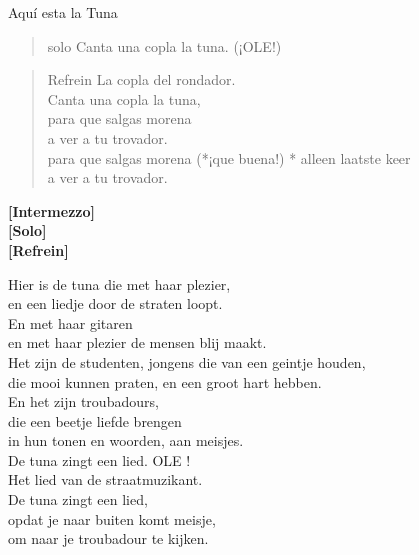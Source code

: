 \begin{song}{Aquí esta la Tuna}
\begin{verse}{solo}
Canta una copla la tuna. (¡OLE!)
\end{verse}
\clearpage
\begin{verse}{Refrein}
\hspace{1em}La copla del rondador.\\
Canta una copla la tuna,\\
para que salgas morena\\
a ver a tu trovador.\\
para que salgas morena (*¡que buena!)\hspace{2em} * alleen laatste keer\\
a ver a tu trovador.\hspace{1em}
\end{verse}

\textbf{[Intermezzo]}\\
\textbf{[Solo]}\\
\textbf{[Refrein]}\\
\end{song}
\begin{translation}
Hier is de tuna die met haar plezier,\\
en een liedje door de straten loopt.\\
En met haar gitaren\\
en met haar plezier de mensen blij maakt.\\\vspace{1em}
Het zijn de studenten, jongens die van een geintje houden,\\
die mooi kunnen praten, en een groot hart hebben.\\
En het zijn troubadours,\\
die een beetje liefde brengen\\
in hun tonen en woorden, aan meisjes.\\\vspace{1em}
De tuna zingt een lied. OLE !\\\vspace{1em}
Het lied van de straatmuzikant.\\
De tuna zingt een lied,\\
opdat je naar buiten komt meisje,\\
om naar je troubadour te kijken.
\end{translation}